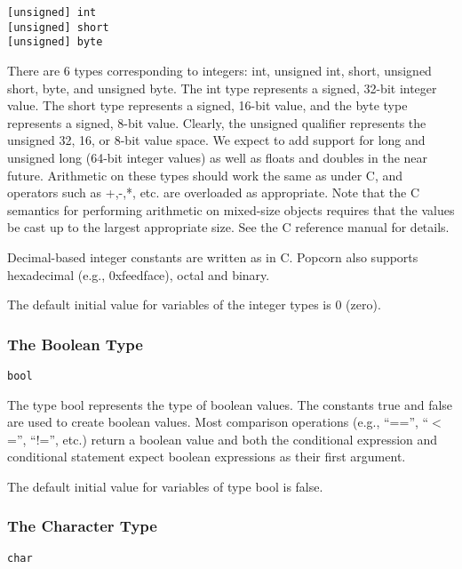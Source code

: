 \documentclass[titlepage,10pt]{article}
\begin{document}
\begin{verbatim}
[unsigned] int
[unsigned] short 
[unsigned] byte
\end{verbatim}

There are 6 types corresponding to integers:  int, unsigned int, short,
unsigned short, byte, and unsigned byte.  The int type represents a
signed, 32-bit integer value.  The short type represents a signed,
16-bit value, and the byte type represents a signed, 8-bit value.
Clearly, the unsigned qualifier represents the unsigned 32, 16, or 8-bit
value space.  We expect to add support for long and unsigned long
(64-bit integer values) as well as floats and doubles in the near
future.   Arithmetic on these types should work the same as under C, and
operators such as +,-,*, etc. are overloaded as appropriate.  Note that
the C semantics for performing arithmetic on mixed-size objects requires
that the values be cast up to the largest appropriate size.  See the C
reference manual for details.

Decimal-based integer constants are written as in C.  Popcorn also
supports hexadecimal (e.g., 0xfeedface), octal and binary.

The default initial value for variables of the integer types is 0 (zero).

\subsubsection{The Boolean Type}


\begin{verbatim}
bool
\end{verbatim}

The type bool represents the type of boolean values.  The constants true
and false are used to create boolean values.  Most comparison operations
(e.g., ``=='', ``$<$='', ``!='', etc.) return a boolean value and both
the conditional expression and conditional statement expect boolean
expressions as their first argument.

The default initial value for variables of type bool is false.

\subsubsection{The Character Type}


\begin{verbatim}
char
\end{verbatim}
\end{document}
